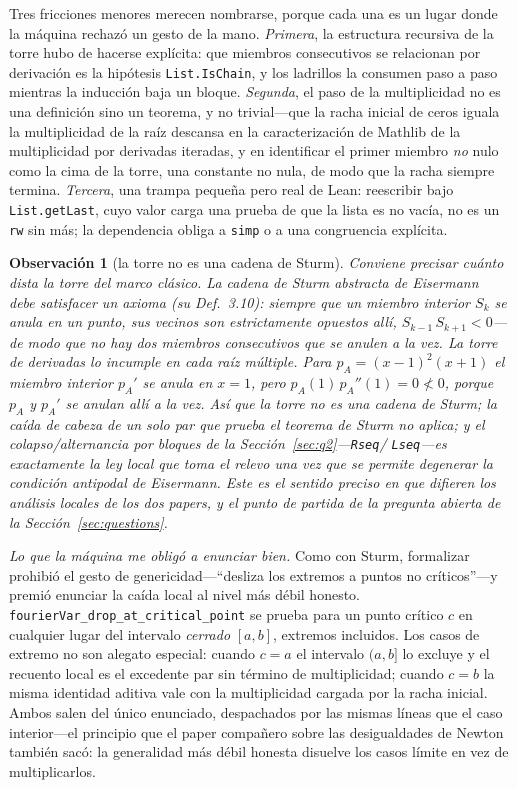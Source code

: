 \documentclass[11pt]{article}
\newtheorem{remark}{Observaci\'on}
\newcommand{\lean}[1]{\texttt{#1}}
\begin{document}
Tres fricciones menores merecen nombrarse, porque cada una es un lugar donde la m\'aquina rechaz\'o un
gesto de la mano. \emph{Primera}, la estructura recursiva de la torre hubo de hacerse expl\'icita: que
miembros consecutivos se relacionan por derivaci\'on es la hip\'otesis \lean{List.IsChain}, y los
ladrillos la consumen paso a paso mientras la inducci\'on baja un bloque. \emph{Segunda}, el paso de la
multiplicidad no es una definici\'on sino un teorema, y no trivial---que la racha inicial de ceros
iguala la multiplicidad de la ra\'iz descansa en la caracterizaci\'on de Mathlib de la multiplicidad
por derivadas iteradas, y en identificar el primer miembro \emph{no} nulo como la cima de la torre, una
constante no nula, de modo que la racha siempre termina. \emph{Tercera}, una trampa peque\~na pero real
de Lean: reescribir bajo \lean{List.getLast}, cuyo valor carga una prueba de que la lista es no vac\'ia,
no es un \lean{rw} sin m\'as; la dependencia obliga a \lean{simp} o a una congruencia expl\'icita.

\begin{remark}[la torre no es una cadena de Sturm]\label{rem:notsturm}
Conviene precisar cu\'anto dista la torre del marco cl\'asico. La \emph{cadena de Sturm} abstracta de
Eisermann~\cite{eisermann} debe satisfacer un axioma (su Def.~3.10): siempre que un miembro
\emph{interior} $S_k$ se anula en un punto, sus vecinos son estrictamente opuestos all\'i,
$S_{k-1}\,S_{k+1}<0$---de modo que no hay dos miembros consecutivos que se anulen a la vez. La torre de
derivadas lo incumple en cada ra\'iz m\'ultiple. Para $p_A=(x-1)^2(x+1)$ el miembro interior $p_A'$ se
anula en $x=1$, pero $p_A(1)\,p_A''(1)=0\not<0$, porque $p_A$ y $p_A'$ se anulan all\'i \emph{a la vez}.
As\'i que la torre no es una cadena de Sturm; la ca\'ida de cabeza de un solo par que prueba el teorema
de Sturm no aplica; y el colapso/alternancia por bloques de la Secci\'on~\ref{sec:q2}---\lean{Rseq}/%
\lean{Lseq}---es exactamente la ley local que toma el relevo una vez que se permite degenerar la
condici\'on antipodal de Eisermann. Este es el sentido preciso en que difieren los an\'alisis locales de
los dos papers, y el punto de partida de la pregunta abierta de la Secci\'on~\ref{sec:questions}.
\end{remark}

\emph{Lo que la m\'aquina me oblig\'o a enunciar bien.} Como con Sturm, formalizar prohibi\'o el gesto
de genericidad---``desliza los extremos a puntos no cr\'iticos''---y premi\'o enunciar la ca\'ida local
al nivel m\'as d\'ebil honesto. \lean{fourierVar\_drop\_at\_critical\_point} se prueba para un punto
cr\'itico $c$ en cualquier lugar del intervalo \emph{cerrado} $[a,b]$, extremos incluidos. Los casos de
extremo no son alegato especial: cuando $c=a$ el intervalo $(a,b]$ lo excluye y el recuento local es el
excedente par sin t\'ermino de multiplicidad; cuando $c=b$ la misma identidad aditiva vale con la
multiplicidad cargada por la racha inicial. Ambos salen del \'unico enunciado, despachados por las
mismas l\'ineas que el caso interior---el principio que el paper compa\~nero sobre las desigualdades de
Newton~\cite{newton} tambi\'en sac\'o: la generalidad m\'as d\'ebil honesta disuelve los casos l\'imite
en vez de multiplicarlos.
\end{document}
